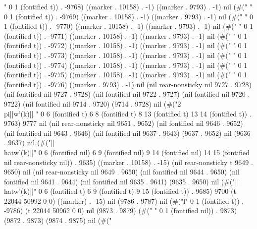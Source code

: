 {" 0 1 (fontified t)) . -9768) ((marker . 10158) . -1) ((marker . 9793) . -1) nil (#("	" 0 1 (fontified t)) . -9769) ((marker . 10158) . -1) ((marker . 9793) . -1) nil (#(" " 0 1 (fontified t)) . -9770) ((marker . 10158) . -1) ((marker . 9793) . -1) nil (#(" " 0 1 (fontified t)) . -9771) ((marker . 10158) . -1) ((marker . 9793) . -1) nil (#(" " 0 1 (fontified t)) . -9772) ((marker . 10158) . -1) ((marker . 9793) . -1) nil (#(" " 0 1 (fontified t)) . -9773) ((marker . 10158) . -1) ((marker . 9793) . -1) nil (#(" " 0 1 (fontified t)) . -9774) ((marker . 10158) . -1) ((marker . 9793) . -1) nil (#(" " 0 1 (fontified t)) . -9775) ((marker . 10158) . -1) ((marker . 9793) . -1) nil (#(" " 0 1 (fontified t)) . -9776) ((marker . 9793) . -1) nil (nil rear-nonsticky nil 9727 . 9728) (nil fontified nil 9727 . 9728) (nil fontified nil 9722 . 9727) (nil fontified nil 9720 . 9722) (nil fontified nil 9714 . 9720) (9714 . 9728) nil (#("2\\pi||w'(k)|| " 0 6 (fontified t) 6 8 (fontified t) 8 13 (fontified t) 13 14 (fontified t)) . 9763) 9777 nil (nil rear-nonsticky nil 9651 . 9652) (nil fontified nil 9646 . 9652) (nil fontified nil 9643 . 9646) (nil fontified nil 9637 . 9643) (9637 . 9652) nil (9636 . 9637) nil (#("||\\hat{w'}(k)||" 0 6 (fontified nil) 6 9 (fontified nil) 9 14 (fontified nil) 14 15 (fontified nil rear-nonsticky nil)) . 9635) ((marker . 10158) . -15) (nil rear-nonsticky t 9649 . 9650) nil (nil rear-nonsticky nil 9649 . 9650) (nil fontified nil 9644 . 9650) (nil fontified nil 9641 . 9644) (nil fontified nil 9635 . 9641) (9635 . 9650) nil (#("||\\hat{w'}(k)||" 0 6 (fontified t) 6 9 (fontified t) 9 15 (fontified t)) . 9685) 9700 (t 22044 50992 0 0) ((marker) . -15) nil (9786 . 9787) nil (#("l" 0 1 (fontified t)) . -9786) (t 22044 50962 0 0) nil (9873 . 9879) (#(" " 0 1 (fontified nil)) . 9873) (9872 . 9873) (9874 . 9875) nil (#("
}
